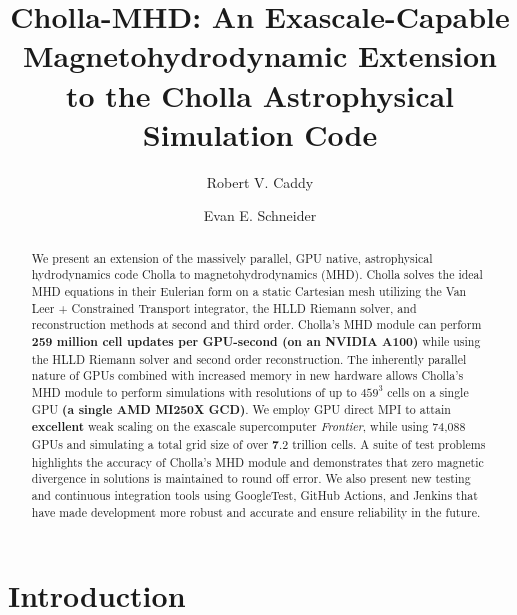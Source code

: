 \documentclass[modern, linenumbers]{aastex631}
\begin{document}
\title{Cholla-MHD: An Exascale-Capable Magnetohydrodynamic Extension to the Cholla Astrophysical Simulation Code}

\author[0000-0002-4475-3181]{Robert V. Caddy}

\author[0000-0001-9735-7484]{Evan E. Schneider}

\begin{abstract}

    We present an extension of the massively parallel, GPU native, astrophysical hydrodynamics code Cholla to magnetohydrodynamics (MHD).
    Cholla solves the ideal MHD equations in their Eulerian form on a static Cartesian mesh utilizing the Van Leer + Constrained Transport integrator, the HLLD Riemann solver, and reconstruction methods at second and third order.
    Cholla's MHD module can perform \textbf{259 million cell updates per GPU-second (on an NVIDIA A100)} while using the HLLD Riemann solver and second order reconstruction.
    The inherently parallel nature of GPUs combined with increased memory in new hardware allows Cholla's MHD module to perform simulations with resolutions of up to $459^3$ cells on a single GPU \textbf{(a single AMD MI250X GCD)}.
    We employ GPU direct MPI to attain \textbf{excellent} weak scaling on the exascale supercomputer \textit{Frontier}, while using 74,088 GPUs and simulating a total grid size of over \textbf{7}.2 trillion cells.
    A suite of test problems highlights the accuracy of Cholla's MHD module and demonstrates that zero magnetic divergence in solutions is maintained to round off error.
    We also present new testing and continuous integration tools using GoogleTest, GitHub Actions, and Jenkins that have made development more robust and accurate and ensure reliability in the future.

    \end{abstract}


\section{Introduction}
\label{sec:intro}
\end{document}
